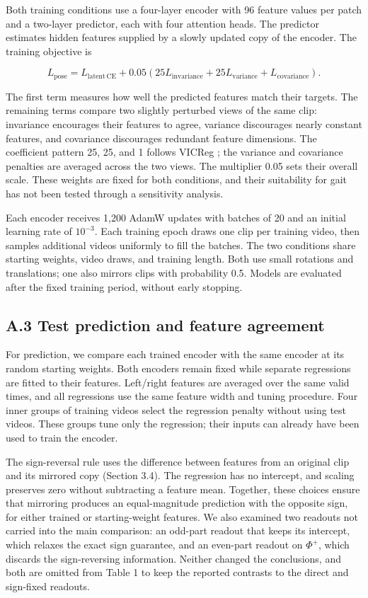 \documentclass{article}
\begin{document}
Both training conditions use a four-layer encoder with 96 feature values
per patch and a two-layer predictor, each with four attention heads. The
predictor estimates hidden features supplied by a slowly updated copy of
the encoder. The training objective is

\[
L_{\mathrm{pose}}=L_{\mathrm{latent\,CE}}+
0.05\left(25L_{\mathrm{invariance}}+
25L_{\mathrm{variance}}+L_{\mathrm{covariance}}\right).
\]

The first term measures how well the predicted features match their
targets. The remaining terms compare two slightly perturbed views of the
same clip: invariance encourages their features to agree, variance
discourages nearly constant features, and covariance discourages
redundant feature dimensions. The coefficient pattern 25, 25, and 1
follows VICReg \citep{bardes2022vicreg}; the variance and covariance
penalties are averaged across the two views. The multiplier 0.05 sets
their overall scale. These weights are fixed for both conditions, and
their suitability for gait has not been tested through a sensitivity
analysis.

Each encoder receives 1,200 AdamW updates with batches of 20 and an
initial learning rate of \(10^{-3}\). Each training epoch draws one clip
per training video, then samples additional videos uniformly to fill the
batches. The two conditions share starting weights, video draws, and
training length. Both use small rotations and translations; one also
mirrors clips with probability 0.5. Models are evaluated after the fixed
training period, without early stopping.

\subsection{A.3 Test prediction and feature
agreement}\label{a.3-test-prediction-and-feature-agreement}

For prediction, we compare each trained encoder with the same encoder at
its random starting weights. Both encoders remain fixed while separate
regressions are fitted to their features. Left/right features are
averaged over the same valid times, and all regressions use the same
feature width and tuning procedure. Four inner groups of training videos
select the regression penalty without using test videos. These groups
tune only the regression; their inputs can already have been used to
train the encoder.

The sign-reversal rule uses the difference between features from an
original clip and its mirrored copy (Section 3.4). The regression has no
intercept, and scaling preserves zero without subtracting a feature
mean. Together, these choices ensure that mirroring produces an
equal-magnitude prediction with the opposite sign, for either trained or
starting-weight features. We also examined two readouts not carried into
the main comparison: an odd-part readout that keeps its intercept, which
relaxes the exact sign guarantee, and an even-part readout on
\(\Phi^+\), which discards the sign-reversing information. Neither
changed the conclusions, and both are omitted from Table 1 to keep the
reported contrasts to the direct and sign-fixed readouts.
\end{document}
